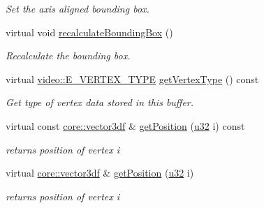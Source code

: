 \begin{DoxyCompactItemize}
\begin{DoxyCompactList}\small\item\em Set the axis aligned bounding box. \end{DoxyCompactList}\item 
virtual void \hyperlink{classirr_1_1scene_1_1CMeshBuffer_aad55263eaf019b090c8d1c3c5f7f4407}{recalculate\+Bounding\+Box} ()
\begin{DoxyCompactList}\small\item\em Recalculate the bounding box. \end{DoxyCompactList}\item 
virtual \hyperlink{namespaceirr_1_1video_a0e3b59e025e0d0db0ed2ee0ce904deac}{video\+::\+E\+\_\+\+V\+E\+R\+T\+E\+X\+\_\+\+T\+Y\+PE} \hyperlink{classirr_1_1scene_1_1CMeshBuffer_a341db661218a49d8d8fd12550700cb67}{get\+Vertex\+Type} () const
\begin{DoxyCompactList}\small\item\em Get type of vertex data stored in this buffer. \end{DoxyCompactList}\item 
\mbox{\label{classirr_1_1scene_1_1CMeshBuffer_a4a94e12e5b3f07a795695693ed9ef18d}} 
virtual const \hyperlink{namespaceirr_1_1core_a06f169d08b5c429f5575acb7edbad811}{core\+::vector3df} \& \hyperlink{classirr_1_1scene_1_1CMeshBuffer_a4a94e12e5b3f07a795695693ed9ef18d}{get\+Position} (\hyperlink{namespaceirr_a0416a53257075833e7002efd0a18e804}{u32} i) const
\begin{DoxyCompactList}\small\item\em returns position of vertex i \end{DoxyCompactList}\item 
\mbox{\label{classirr_1_1scene_1_1CMeshBuffer_a70890de5d1014a4bf1b1f9e7819f8e9b}} 
virtual \hyperlink{namespaceirr_1_1core_a06f169d08b5c429f5575acb7edbad811}{core\+::vector3df} \& \hyperlink{classirr_1_1scene_1_1CMeshBuffer_a70890de5d1014a4bf1b1f9e7819f8e9b}{get\+Position} (\hyperlink{namespaceirr_a0416a53257075833e7002efd0a18e804}{u32} i)
\begin{DoxyCompactList}\small\item\em returns position of vertex i \end{DoxyCompactList}\item 
\mbox{\label{classirr_1_1scene_1_1CMeshBuffer_ac93c92c49e801141cab699484bcf818d}} 

\end{DoxyCompactItemize}
